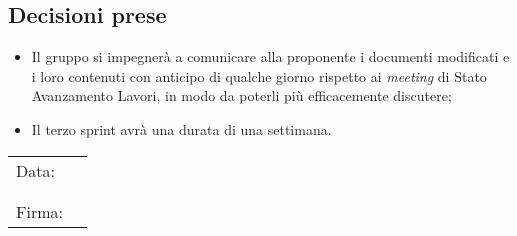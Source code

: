 \documentclass[italian,12pt]{article}
\begin{document}
\subsection{Decisioni prese}
\begin{itemize}
	\item Il gruppo si impegnerà a comunicare alla proponente i documenti modificati e i loro contenuti con anticipo di qualche giorno rispetto ai \textit{meeting}
	      di Stato Avanzamento Lavori, in modo da poterli più efficacemente discutere;
	\item Il terzo sprint avrà una durata di una settimana.
\end{itemize}

\newpage
\begin{table}[b]
	\begin{tabular}{@{}p{.5in}p{4in}@{}}
		Data:  & \hrulefill \\
		       &            \\
		       &            \\
		Firma: & \hrulefill \\
	\end{tabular}
\end{table}
\end{document}
